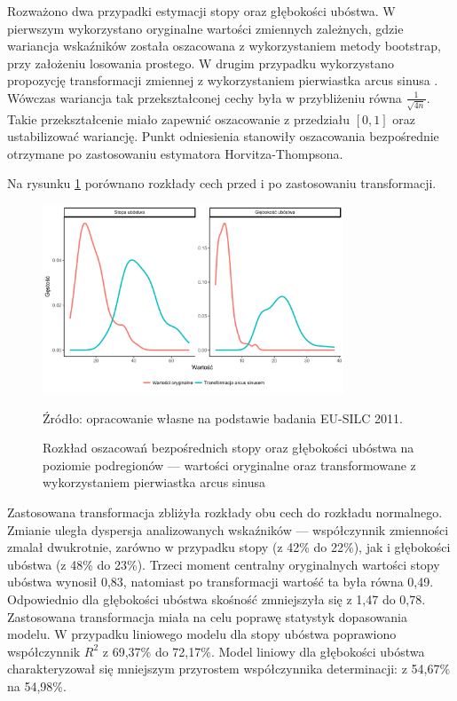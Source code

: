 Rozważono dwa przypadki estymacji stopy oraz głębokości ubóstwa. W pierwszym wykorzystano oryginalne wartości zmiennych zależnych, gdzie wariancja wskaźników została oszacowana z wykorzystaniem metody bootstrap, przy założeniu losowania prostego. W drugim przypadku wykorzystano propozycję transformacji zmiennej z wykorzystaniem pierwiastka arcus sinusa \citep{analpovdata52016}. Wówczas wariancja tak przekształconej cechy była w przybliżeniu równa $\frac{1}{\sqrt{4n}}$. Takie przekształcenie miało zapewnić oszacowanie z przedziału $[0,1]$ oraz ustabilizować wariancję. Punkt odniesienia stanowiły oszacowania bezpośrednie otrzymane po zastosowaniu estymatora Horvitza-Thompsona.

Na rysunku \ref{fig:podreg_trans} porównano rozkłady cech przed i po zastosowaniu transformacji.

\begin{figure}[htp]
\centering
\includegraphics[width=0.8\textwidth]{04_wykresy/podreg_trans-1.pdf}
\caption{Rozkład oszacowań bezpośrednich stopy oraz głębokości ubóstwa na poziomie podregionów --- wartości oryginalne oraz transformowane z wykorzystaniem pierwiastka arcus sinusa}
\small{Źródło: opracowanie własne na podstawie badania EU-SILC 2011.}
\label{fig:podreg_trans}
\end{figure}

Zastosowana transformacja zbliżyła rozkłady obu cech do rozkładu normalnego. Zmianie uległa dyspersja analizowanych wskaźników --- współczynnik zmienności zmalał dwukrotnie, zarówno w przypadku stopy (z 42\% do 22\%), jak i głębokości ubóstwa (z 48\% do 23\%). Trzeci moment centralny oryginalnych wartości stopy ubóstwa wynosił 0,83, natomiast po transformacji wartość ta była równa 0,49. Odpowiednio dla głębokości ubóstwa skośność zmniejszyła się z 1,47 do 0,78. Zastosowana transformacja miała na celu poprawę statystyk dopasowania modelu. W przypadku liniowego modelu dla stopy ubóstwa poprawiono współczynnik $R^2$ z 69,37\% do 72,17\%. Model liniowy dla głębokości ubóstwa charakteryzował się mniejszym przyrostem współczynnika determinacji: z 54,67\% na 54,98\%.

